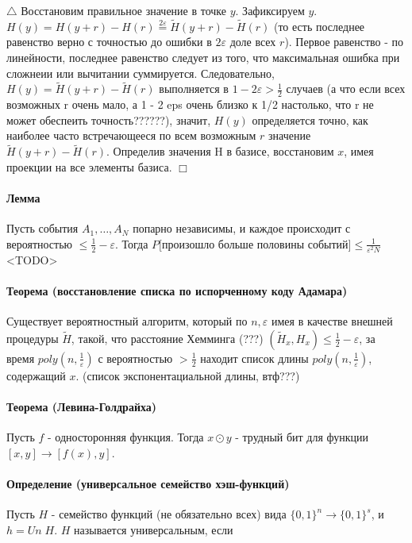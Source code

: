 \documentclass[12pt, a4paper]{article}
\newcommand{\uniform}{Un \;}
\newcommand{\bool}{\{0, 1\}}
\newcommand{\eps}{\varepsilon}
\begin{document}
$\triangle$ Восстановим правильное значение в точке $y$. Зафиксируем $y$. $H(y) = H(y + r) - H(r) \stackrel{2 \eps}{=} \widetilde{H}(y + r) - \widetilde{H}(r)$ (то есть последнее равенство верно с точностью до ошибки в $2 \eps$ доле всех $r$). Первое равенство - по линейности, последнее равенство следует из того, что максимальная ошибка при сложнеии или вычитании суммируется. Следовательно, $H(y) = \widetilde{H}(y + r) - \widetilde{H}(r)$ выполняется в $1 - 2\eps > \frac{1}{2}$ случаев (а что если всех возможных r очень мало, а 1 - 2 eps очень близко к 1/2 настолько, что r не может обеспеить точность??????), значит, $H(y)$ определяется точно, как наиболее часто встречающееся по всем возможным $r$ значение $\widetilde{H}(y + r) - \widetilde{H}(r)$. Определив значения H в базисе, восстановим $x$, имея проекции на все элементы базиса.
$\Box$

\paragraph{Лемма} Пусть события $A_1, \dots, A_N$ попарно независимы, и каждое происходит с вероятностью $\leq \frac{1}{2} - \eps$. Тогда $P[$произошло больше половины событий$] \leq \frac{1}{\eps^2 N}$
<TODO>

\paragraph{Теорема (восстановление списка по испорченному коду Адамара)} Существует вероятностный алгоритм, который по $n, \eps$ имея в качестве внешней процедуры $\widetilde{H}$, такой, что расстояние Хемминга (???) $(\widetilde{H}_x, H_x) \leq \frac{1}{2} - \eps$, за время $poly(n, \frac{1}{\eps})$ с вероятностью $ > \frac{1}{2}$ находит список длины $poly(n, \frac{1}{\eps})$, содержащий $x$. (список экспонентациальной длины, втф???)

\paragraph{Теорема (Левина-Голдрайха)} Пусть $f$ - односторонняя функция. Тогда $x \odot y$ - трудный бит для функции $[x, y] \rightarrow [f(x), y]$.

\paragraph{Определение (универсальное семейство хэш-функций)} Пусть $H$ - семейство функций (не обязательно всех) вида $\bool^n \rightarrow \bool^s$, и $h = \uniform H$. $H$ называется универсальным, если
\end{document}
